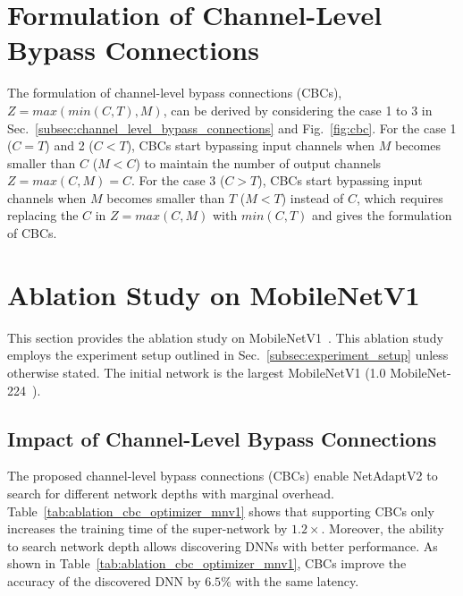 \section{Formulation of Channel-Level Bypass Connections}

The formulation of channel-level bypass connections (CBCs), $Z = max(min(C, T), M)$, can be derived by considering the case 1 to 3 in Sec.~\ref{subsec:channel_level_bypass_connections} and Fig.~\ref{fig:cbc}. For the case 1 ($C = T$) and 2 ($C < T$), CBCs start bypassing input channels when $M$ becomes smaller than $C$ ($M < C$) to maintain the number of output channels $Z = max(C, M) = C$. For the case 3 ($C > T$), CBCs start bypassing input channels when $M$ becomes smaller than $T$ ($M < T$) instead of $C$, which requires replacing the $C$ in $Z = max(C, M)$ with $min(C, T)$ and gives the formulation of CBCs.

\section{Ablation Study on MobileNetV1}

This section provides the ablation study on MobileNetV1~\cite{Howard2017MobileNetV1}. This ablation study employs the experiment setup outlined in Sec.~\ref{subsec:experiment_setup} unless otherwise stated. The initial network is the largest MobileNetV1 (1.0 MobileNet-224~\cite{Howard2017MobileNetV1}).

\subsection{Impact of Channel-Level Bypass Connections}
The proposed channel-level bypass connections (CBCs) enable NetAdaptV2 to search for different network depths with marginal overhead. Table~\ref{tab:ablation_cbc_optimizer_mnv1} shows that supporting CBCs only increases the training time of the super-network by $1.2\times$. Moreover, the ability to search network depth allows discovering DNNs with better performance. As shown in Table~\ref{tab:ablation_cbc_optimizer_mnv1}, CBCs improve the accuracy of the discovered DNN by $6.5\%$ with the same latency.


